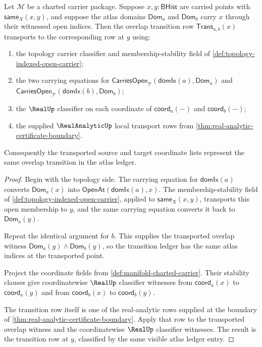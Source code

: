 \begin{theorem}
\label{thm:manifold-transition-classifier-stability}
Let $\mathcal{M}$ be a charted carrier package. Suppose $x,y:\mathsf{BHist}$
are carried points with $\mathsf{same}_X(x,y)$, and suppose the atlas domains
$\mathsf{Dom}_a$ and $\mathsf{Dom}_b$ carry $x$ through their witnessed open
indices. Then the overlap transition row
$\mathsf{Trans}_{a,b}(x)$ transports to the corresponding row at $y$ using:
\begin{enumerate}
\item the topology carrier classifier and membership-stability field of
\autoref{def:topology-indexed-open-carrier};
\item the two carrying equations for
$\mathsf{CarriesOpen}_{\mathcal{T}}(\mathsf{domIx}(a),\mathsf{Dom}_a)$ and
$\mathsf{CarriesOpen}_{\mathcal{T}}(\mathsf{domIx}(b),\mathsf{Dom}_b)$;
\item the $\RealUp$ classifier on each coordinate of
$\mathsf{coord}_a(-)$ and $\mathsf{coord}_b(-)$;
\item the supplied $\RealAnalyticUp$ local transport rows from
\autoref{thm:real-analytic-certificate-boundary}.
\end{enumerate}
Consequently the transported source and target coordinate lists represent the
same overlap transition in the atlas ledger.
\end{theorem}
\begin{proof}
Begin with the topology side. The carrying equation for
$\mathsf{domIx}(a)$ converts $\mathsf{Dom}_a(x)$ into
$\mathsf{OpenAt}(\mathsf{domIx}(a),x)$. The membership-stability field of
\autoref{def:topology-indexed-open-carrier}, applied to
$\mathsf{same}_X(x,y)$, transports this open membership to $y$, and the same
carrying equation converts it back to $\mathsf{Dom}_a(y)$.

Repeat the identical argument for $b$. This supplies the transported overlap
witness $\mathsf{Dom}_a(y)\wedge\mathsf{Dom}_b(y)$, so the transition ledger
has the same atlas indices at the transported point.

Project the coordinate fields from
\autoref{def:manifold-charted-carrier}. Their stability clauses give
coordinatewise $\RealUp$ classifier witnesses from
$\mathsf{coord}_a(x)$ to $\mathsf{coord}_a(y)$ and from
$\mathsf{coord}_b(x)$ to $\mathsf{coord}_b(y)$.

The transition row itself is one of the real-analytic rows supplied at the
boundary of \autoref{thm:real-analytic-certificate-boundary}. Apply that row
to the transported overlap witness and the coordinatewise $\RealUp$ classifier
witnesses. The result is the transition row at $y$, classified by the same
visible atlas ledger entry.
\end{proof}

